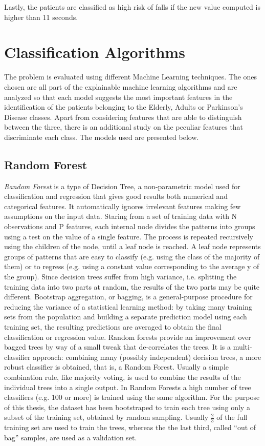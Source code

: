 Lastly, the patients are classified as high risk of falls if the new value computed is higher than 11 seconds.


\section{Classification Algorithms}

The problem is evaluated using different Machine Learning techniques. The ones chosen are all part of the explainable machine learning algorithms and 
are analyzed so that each model suggests the most important features in the identification of the patients belonging to the Elderly, Adults or Parkinson's Disease classes.
Apart from considering features that are able to distinguish between the three, there is an additional study on the peculiar features that discriminate each class.
The models used are presented below.

\subsection{Random Forest}

\textit{Random Forest} is a type of Decision Tree, a non-parametric model used for classification and regression that gives good 
results both numerical and categorical features. It automatically ignores irrelevant features making few assumptions
on the input data. Staring from a set of training data with N observations and P features, each internal node divides the patterns into groups using a test on the value 
of a single feature. The process is repeated recursively using the children of the node, until a leaf node is reached. A leaf node represents groups of patterns that are easy to classify (e.g. using the class of the majority of 
them) or to regress (e.g. using a constant value corresponding to the average y of the group).
Since decision trees suffer from high variance, i.e. splitting the training data into two 
parts at random, the results of the two parts may be quite different. 
Bootstrap aggregation, or bagging, is a general-purpose procedure for reducing the 
variance of a statistical learning method: by taking many training sets from the population and building a separate 
prediction model using each training set, the resulting predictions are averaged to obtain the final classification or regression value.
Random forests provide an improvement over bagged trees by way of a small tweak that 
de-correlates the trees. It is a multi-classifier approach: combining many (possibly independent) 
decision trees, a more robust classifier is obtained, that is, a Random Forest. Usually a simple combination rule, like majority voting, is used to combine the results of the individual trees into a single output.
In Random Forests a high number of tree classifiers (e.g. 100 or more) is trained using the same 
algorithm. 
For the purpose of this thesis, the dataset has been bootstraped to train each tree using only a subset of the training set, obtained by random sampling.
Usually $\frac{2}{3}$ of the full training set are used to train the trees, whereas the the last third, called \enquote{out of bag} samples, are used as a validation set.


